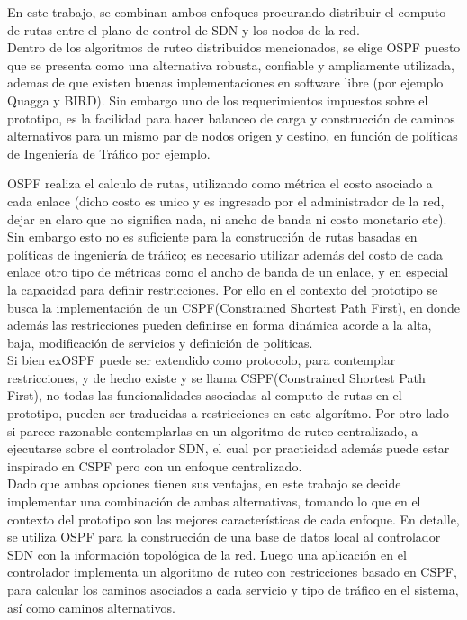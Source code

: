 En este trabajo, se combinan ambos enfoques procurando distribuir el computo de rutas entre el plano de control de SDN y los nodos de la red.\\

Dentro de los algoritmos de ruteo distribuidos mencionados, se elige OSPF puesto que se presenta como una alternativa robusta, confiable y ampliamente utilizada, ademas de que existen buenas implementaciones en software libre (por ejemplo Quagga y BIRD). Sin embargo uno de los requerimientos impuestos sobre el prototipo, es la facilidad para hacer balanceo de carga y construcci\'on de caminos alternativos para un mismo par de nodos origen y destino, en funci\'on de políticas de Ingeniería de Tr\'afico por ejemplo. 

OSPF realiza el calculo de rutas, utilizando como m\'etrica el costo asociado a cada enlace (dicho costo es unico y es ingresado por el administrador de la red, dejar en claro que no significa nada, ni ancho de banda ni costo monetario etc). Sin embargo esto no es suficiente para la construcci\'on de rutas basadas en políticas de ingeniería de tr\'afico; es necesario utilizar adem\'as del costo de cada enlace otro tipo de m\'etricas como el ancho de banda de un enlace, y en especial la capacidad para definir restricciones. Por ello en el contexto del prototipo se busca la implementaci\'on de un CSPF(Constrained Shortest Path First), en donde adem\'as las restricciones pueden definirse en forma din\'amica acorde a la alta, baja, modificaci\'on de servicios y definici\'on de pol\'iticas.\\

Si bien exOSPF puede ser extendido como protocolo, para contemplar restricciones, y de hecho existe y se llama CSPF(Constrained Shortest Path First), no todas las funcionalidades asociadas al computo de rutas en el prototipo, pueden ser traducidas a restricciones en este algor\'itmo. Por otro lado si parece razonable contemplarlas en un algoritmo de ruteo centralizado, a ejecutarse sobre el controlador SDN, el cual por practicidad adem\'as puede estar inspirado en CSPF pero con un enfoque centralizado.\\

Dado que ambas opciones tienen sus ventajas, en este trabajo se decide implementar una combinaci\'on de ambas alternativas, tomando lo que en el contexto del prototipo son las mejores caracter\'isticas de cada enfoque. 
En detalle, se utiliza OSPF para la construcci\'on de una base de datos local al controlador SDN con la informaci\'on topol\'ogica de la red. Luego una aplicaci\'on en el controlador implementa un algoritmo de ruteo con restricciones basado en CSPF, para calcular los caminos asociados a cada servicio y tipo de tr\'afico en el sistema, así como caminos alternativos. 


